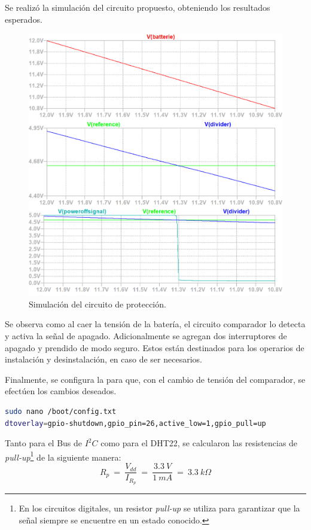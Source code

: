 Se realizó la simulación del circuito propuesto, obteniendo los resultados esperados.
\begin{figure}[H]
	\centering
    \includegraphics[width=0.9\linewidth]{ImagenesIngenieria de Detalle/Simulation}	
	\caption{Simulación del circuito de protección.}
	\label{fig:sim}
\end{figure}

Se observa como al caer la tensión de la batería, el circuito comparador lo detecta y activa la señal de apagado. Adicionalmente se agregan dos interruptores de apagado y prendido de modo seguro. Estos están destinados para los operarios de instalación y desinstalación, en caso de ser necesarios.

Finalmente, se configura la \rspi para que, con el cambio de tensión del comparador, se efectúen los cambios deseados.
\begin{lstlisting}[language=bash]
sudo nano /boot/config.txt 
dtoverlay=gpio-shutdown,gpio_pin=26,active_low=1,gpio_pull=up
\end{lstlisting} 

Tanto para el Bus de $I^2C$ como para el DHT22, se calcularon las resistencias de \textit{pull-up}\footnote{En los circuitos digitales, un resistor \textit{pull-up} se utiliza para garantizar que la señal siempre se encuentre en un estado conocido.} de la siguiente manera:
\begin{equation}
	R_p \ = \  \frac{V_{dd}}{I_{R_p}} \ = \ \frac{3.3 \ V}{1 \ mA} \ = \ 3.3 \ k\Omega  
\end{equation}

